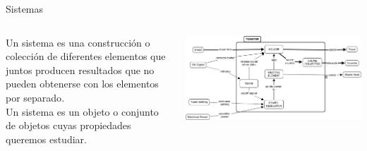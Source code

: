 \documentclass[aspectratio=169]{beamer}
\begin{document}
\begin{frame}{Sistemas}
    \begin{columns}[onlytextwidth]
        \begin{column}{0.5\textwidth}
        Un sistema es una construcción o colección de diferentes elementos que juntos producen resultados que no pueden obtenerse con los elementos por separado\cite{INCOSE}.\\[8pt]
        Un sistema es un objeto o conjunto de objetos cuyas propiedades queremos estudiar\cite{modelica}.
        \end{column}
        \begin{column}{0.5\textwidth}
            \begin{center}
               \includegraphics[width=\textwidth]{fig/tostadora.jpg}
            \end{center}
        \end{column}
    \end{columns}
\end{frame}
\end{document}
